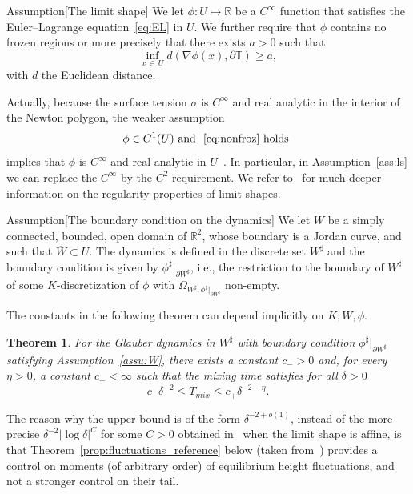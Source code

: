 \documentclass[10pt]{amsart}
\newtheorem{theo}{Theorem}[section]
\theoremstyle{definition}\newtheorem{defi}[theo]{Definition}\newtheorem{rema}[theo]{Remark}\newtheorem{exam}[theo]{Example}\newtheorem{exem}[theo]{Example}\newtheorem{nota}[theo]{Notation}
\newcommand{\R}{\mathbb{R}}
\newcommand{\bbT}{\mathbb{T}}
\renewcommand{\d}{{\sharp }}
\begin{document}
\begin{enonce}
{Assumption}[The limit shape]\label{ass:ls}
We let $\phi:U\mapsto \R$ be a $C^\infty$ function that satisfies the Euler--Lagrange equation~\eqref{eq:EL} in $U$. We further require that $\phi$ contains no frozen regions or more precisely that there exists $a>0$ such that
\begin{equation}\label{eq:nonfroz}
\inf_{x\,\in\,U}d(\nabla\phi(x),\partial\bbT)\ge a,
\end{equation}
with $d$ the Euclidean distance.
\end{enonce}

Actually, because the surface tension $\sigma$ is $C^\infty$ and real analytic in the interior of the Newton polygon, the weaker assumption
\begin{equation}\label{eq:weaker}
\phi\in C^1(U) \text{ and }~\eqref{eq:nonfroz} \text{ holds }
\end{equation}
implies that $\phi$ is $C^\infty$ and real analytic in $U$~\cite[Sec.~VI.3]{Giaquinta}. In particular, in Assumption~\ref{ass:ls} we can replace the $C^\infty$ by the $C^2$ requirement. We refer to~\cite{Duse} for much deeper information on the regularity properties of limit shapes.


\begin{enonce}{Assumption}[The boundary condition on the dynamics]\label{assu:W}
We let $W$ be a simply connected, bounded, open domain of $\R^2$, whose boundary is a Jordan curve, and such that $\overline W\subset U$. The dynamics is defined in the discrete set $W^\d$ and the boundary condition is given by $\phi^\d|_{\partial W^\d}$, i.e., the restriction to the boundary of $W^\d$ of some $K$-discretization of $\phi$ with $\Omega_{W^\d,\phi^\d|_{\partial W^\d}}$ non-empty.
\end{enonce}

The constants in the following theorem can depend implicitly on $K,W,\phi$.
\begin{theo}\label{th:main}
For the Glauber dynamics in $W^\d$ with boundary condition $\phi^\d|_{\partial W^\d}$ satisfying Assumption~\ref{assu:W}, there exists a constant $c_->0$ and, for every $\eta>0$, a constant $c_+<\infty$ such that the mixing time satisfies for all $\delta>0$
\begin{equation}\label{eq:main}
c_- \delta^{-2}\le T_{mix}\le c_+\delta^{-2-\eta}.
\end{equation}
\end{theo}

The reason why the upper bound is of the form $\delta^{-2+o(1)}$, instead of the more precise $\delta^{-2}|\log \delta|^C$ for some $C>0$ obtained in~\cite{CMT} when the limit shape is affine, is that
Theorem~\ref{prop:fluctuations_reference} below (taken from~\cite{L_arxiv}) provides a control on moments (of arbitrary order) of equilibrium height fluctuations, and not a stronger control on their tail.
\end{document}
